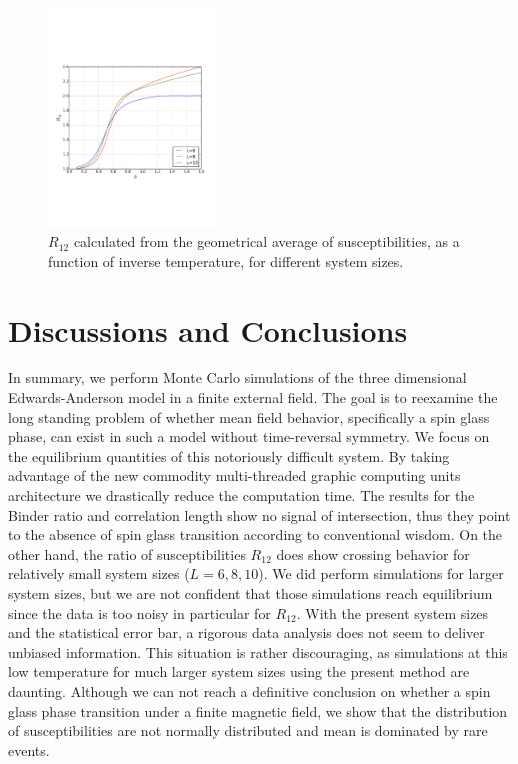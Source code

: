 \documentclass[aps,prb,twocolumn,showpacs,superscriptaddress]{revtex4}
\begin{document}
\begin{figure}[ht]
  \centering
  \includegraphics[width=0.4\textwidth]{img/r12_gmean_h01.pdf}
\caption{\label{fig:r12_gmean} $R_{12}$ calculated from the geometrical average
of susceptibilities, 
as a function of inverse temperature, for different system sizes. 
}
\end{figure}


\section{Discussions and Conclusions}
In summary, we perform Monte Carlo simulations of the three dimensional
Edwards-Anderson model in a finite external field. The goal is to reexamine the long 
standing problem of whether mean field behavior, specifically a spin glass phase, can
exist in such a model without time-reversal symmetry. We focus on the equilibrium quantities
of this notoriously difficult system. By taking advantage of the new commodity multi-threaded 
graphic computing units architecture we drastically reduce the computation time. 
The results for the Binder ratio and correlation length show no signal of intersection, thus they point to the absence of spin glass transition
according to conventional wisdom. On the other hand, the ratio of susceptibilities 
$R_{12}$ does show crossing behavior for relatively small system sizes ($L=6,8,10$). 
We did perform simulations for larger system sizes, 
but we are not confident that those simulations reach equilibrium since the data is too noisy in particular for $R_{12}$.
With the present system sizes and the statistical error bar, a rigorous data 
analysis does not seem to deliver unbiased information. 
This situation is rather discouraging, as simulations at this low temperature 
for much larger system sizes using the present method are daunting. 
Although we can not reach a definitive conclusion on whether a spin glass phase 
transition under a finite magnetic field,
we show that the distribution of susceptibilities are not normally distributed 
and mean is dominated by rare events.
\end{document}
